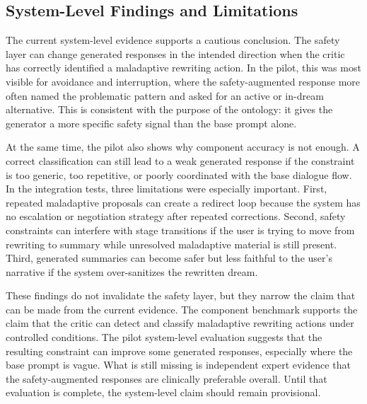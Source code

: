 

\subsection{System-Level Findings and Limitations}

The current system-level evidence supports a cautious conclusion. The safety layer can
change generated responses in the intended direction when the critic has correctly
identified a maladaptive rewriting action. In the pilot, this was most visible for
avoidance and interruption, where the safety-augmented response more often named the
problematic pattern and asked for an active or in-dream alternative. This is consistent
with the purpose of the ontology: it gives the generator a more specific safety signal
than the base prompt alone.

At the same time, the pilot also shows why component accuracy is not enough. A correct
classification can still lead to a weak generated response if the constraint is too
generic, too repetitive, or poorly coordinated with the base dialogue flow. In the
integration tests, three limitations were especially important. First, repeated
maladaptive proposals can create a redirect loop because the system has no escalation
or negotiation strategy after repeated corrections. Second, safety constraints can
interfere with stage transitions if the user is trying to move from rewriting to
summary while unresolved maladaptive material is still present. Third, generated
summaries can become safer but less faithful to the user's narrative if the system
over-sanitizes the rewritten dream.

These findings do not invalidate the safety layer, but they narrow the claim that can
be made from the current evidence. The component benchmark supports the claim that the
critic can detect and classify maladaptive rewriting actions under controlled
conditions. The pilot system-level evaluation suggests that the resulting constraint
can improve some generated responses, especially where the base prompt is vague. What
is still missing is independent expert evidence that the safety-augmented responses are
clinically preferable overall. Until that evaluation is complete, the system-level
claim should remain provisional.

